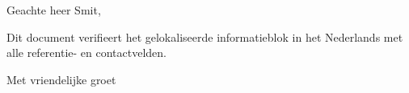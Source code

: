 \documentclass[basic, infoblock, lang=dutch]{../../onlinebrief24}
\begin{document}
\begin{letter}{}
\opening{Geachte heer Smit,}

Dit document verifieert het gelokaliseerde informatieblok in het
Nederlands met alle referentie- en contactvelden.

\closing{Met vriendelijke groet}
\end{letter}
\end{document}

